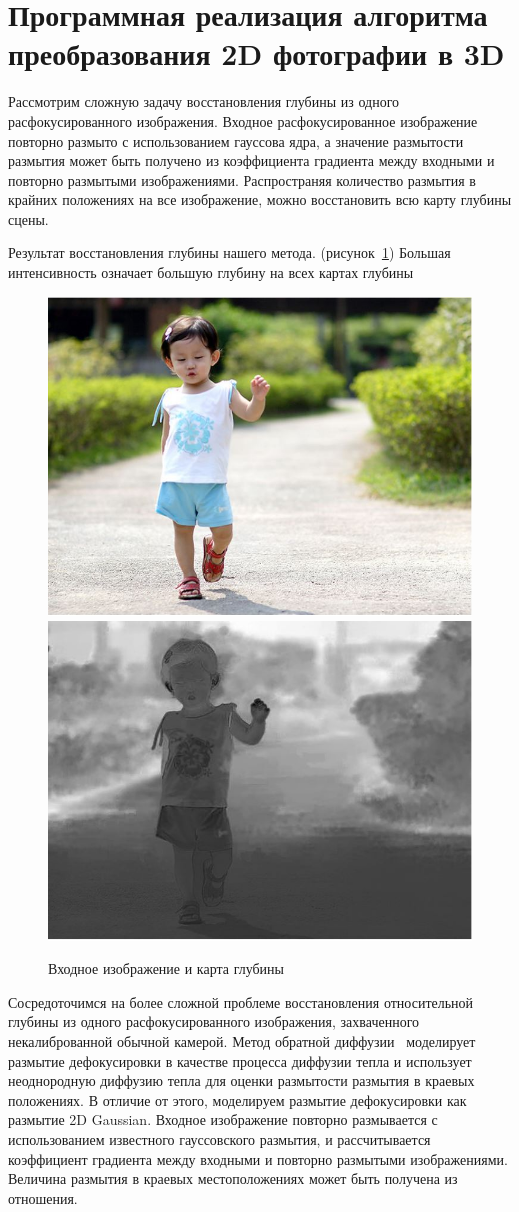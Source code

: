 
\section{Программная реализация алгоритма преобразования 2D фотографии в 3D}

Рассмотрим сложную задачу восстановления глубины из одного расфокусированного изображения. Входное расфокусированное изображение повторно размыто с использованием гауссова ядра, а значение размытости размытия может быть получено из коэффициента градиента между входными и повторно размытыми изображениями. Распространяя количество размытия в крайних положениях на все изображение, можно восстановить всю карту глубины сцены.

Результат восстановления глубины нашего метода. (рисунок~\ref{fig:input}) Большая интенсивность означает большую глубину на всех картах глубины

\begin{figure}[H]
	\centering
	\includegraphics[width=0.4\linewidth]{pics/input}
	\includegraphics[width=0.4\linewidth]{pics/depth_map}
	\caption{Входное изображение и карта глубины}
	\label{fig:input}
\end{figure}

Сосредоточимся на более сложной проблеме восстановления относительной глубины из одного расфокусированного изображения, захваченного некалиброванной обычной камерой. Метод обратной диффузии~\cite{Proc} моделирует размытие дефокусировки в качестве процесса диффузии тепла и использует неоднородную диффузию тепла для оценки размытости размытия в краевых положениях. В отличие от этого, моделируем размытие дефокусировки как размытие 2D Gaussian. Входное изображение повторно размывается с использованием известного гауссовского размытия, и рассчитывается коэффициент градиента между входными и повторно размытыми изображениями. Величина размытия в краевых местоположениях может быть получена из отношения.

